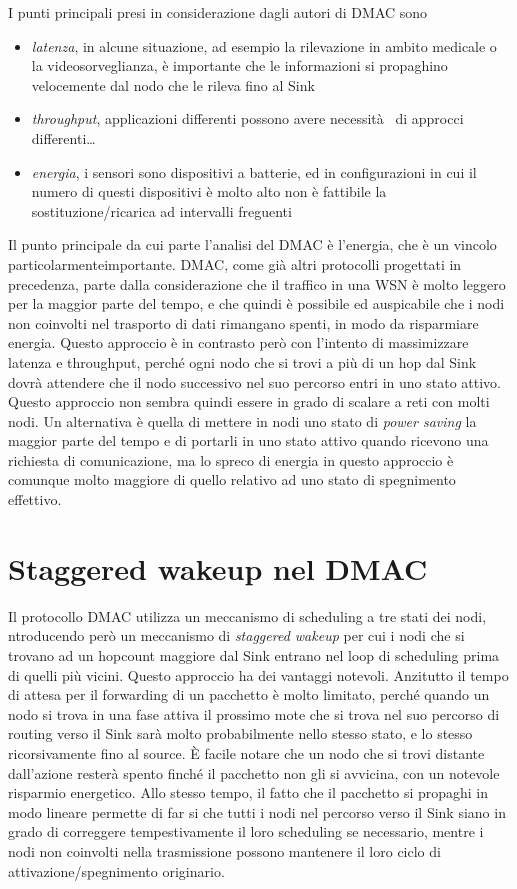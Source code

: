 \documentclass[pdftex,12pt,a4paper,italian,openany]{book}
\begin{document}
I punti principali presi in considerazione dagli autori di DMAC sono
\begin{itemize}

\item \emph{latenza}, in alcune situazione, ad esempio la rilevazione in ambito medicale o 
la videosorveglianza, è importante che le informazioni si propaghino velocemente dal nodo che le 
rileva fino al Sink
\item \emph{throughput}, applicazioni differenti possono avere necessità  di approcci differenti\ldots

\item \emph{energia}, i sensori sono dispositivi a batterie, ed in configurazioni in cui il 
numero di questi dispositivi è molto alto non è fattibile la sostituzione/ricarica ad 
intervalli freguenti

\end{itemize}

Il punto principale da cui parte l'analisi del DMAC è l'energia, che è un vincolo particolarmenteimportante. DMAC, come già altri protocolli progettati in precedenza, parte dalla 
considerazione che il traffico in una WSN è molto leggero per la maggior parte del tempo, e 
che quindi è 
possibile ed auspicabile che i nodi non coinvolti nel trasporto di dati rimangano spenti, 
in modo da risparmiare energia. 
Questo approccio è in contrasto però con l'intento di massimizzare latenza e throughput, 
perché ogni nodo che si trovi a più di un hop dal Sink dovrà attendere che il nodo successivo 
nel suo percorso entri in uno stato attivo. Questo approccio non sembra quindi essere in grado 
di scalare a reti con molti nodi. 
Un alternativa è quella di mettere in nodi uno stato di \emph{power saving} la 
maggior parte del tempo e di portarli in uno stato attivo quando ricevono una richiesta di 
comunicazione, ma lo spreco di energia in questo approccio è comunque molto maggiore di quello 
relativo ad uno stato di spegnimento effettivo. 
\section{Staggered wakeup nel DMAC}
Il protocollo DMAC utilizza un meccanismo di scheduling a tre stati dei nodi, 
ntroducendo però un meccanismo di \emph{staggered wakeup} per cui i nodi che si trovano ad un 
hopcount maggiore dal Sink entrano nel loop di scheduling prima di quelli più vicini.
Questo approccio ha dei vantaggi notevoli. Anzitutto il tempo di attesa per il forwarding di un pacchetto è molto limitato, perché quando un nodo si trova in una fase attiva il prossimo mote 
che si trova nel suo percorso di routing verso il Sink sarà molto probabilmente nello stesso 
stato, e lo stesso ricorsivamente fino al source. 
\`E facile notare che un nodo che si trovi distante dall'azione resterà spento finché il 
pacchetto non gli si avvicina, con un notevole risparmio energetico.
Allo stesso tempo, il fatto che il pacchetto si propaghi in modo lineare permette di far si che 
tutti i nodi nel percorso verso il Sink siano in grado di correggere tempestivamente il loro 
scheduling se necessario, mentre i nodi non coinvolti nella trasmissione possono mantenere il 
loro ciclo di attivazione/spegnimento originario. 
\end{document}
